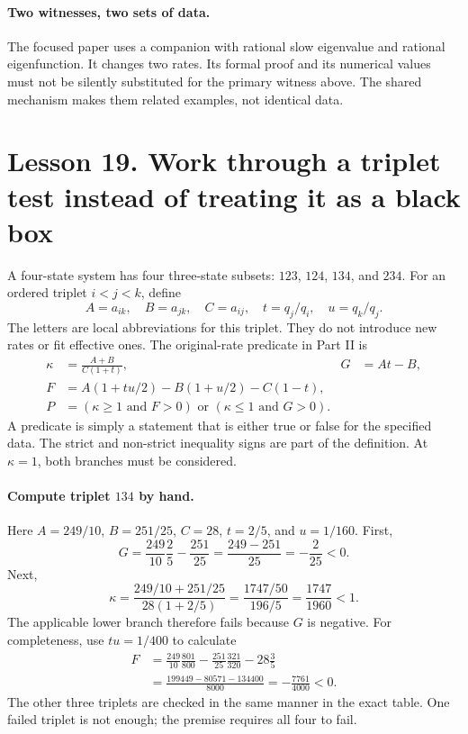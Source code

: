 \paragraph{Two witnesses, two sets of data.}
The focused paper uses a companion with rational slow eigenvalue and
rational eigenfunction. It changes two rates. Its formal proof and its
numerical values must not be silently substituted for the primary witness
above. The shared mechanism makes them related examples, not identical data.

\clearpage
\section*{Lesson 19. Work through a triplet test instead of treating it as a black box}
A four-state system has four three-state subsets: $123$, $124$, $134$, and
$234$. For an ordered triplet $i<j<k$, define
\[
A=a_{ik},\quad B=a_{jk},\quad C=a_{ij},\quad
 t=q_j/q_i,\quad u=q_k/q_j.
\]
The letters are local abbreviations for this triplet. They do not introduce
new rates or fit effective ones. The original-rate predicate in Part II is
\begin{align*}
\kappa&=\frac{A+B}{C(1+t)},&G&=At-B,\\
F&=A(1+tu/2)-B(1+u/2)-C(1-t),\\
P&=(\kappa\geq1\text{ and }F>0)
\text{ or }(\kappa\leq1\text{ and }G>0).
\end{align*}
A predicate is simply a statement that is either true or false for the
specified data. The strict and non-strict inequality signs are part of the
definition. At $\kappa=1$, both branches must be considered.

\paragraph{Compute triplet $134$ by hand.}
Here $A=249/10$, $B=251/25$, $C=28$, $t=2/5$, and $u=1/160$.
First,
\[
G=\frac{249}{10}\frac25-\frac{251}{25}
=\frac{249-251}{25}=-\frac2{25}<0.
\]
Next,
\[
\kappa=\frac{249/10+251/25}{28(1+2/5)}
=\frac{1747/50}{196/5}=\frac{1747}{1960}<1.
\]
The applicable lower branch therefore fails because $G$ is negative.
For completeness, use $tu=1/400$ to calculate
\begin{align*}
F&=\frac{249}{10}\frac{801}{800}
-\frac{251}{25}\frac{321}{320}-28\frac35\\
&=\frac{199449-80571-134400}{8000}
=-\frac{7761}{4000}<0.
\end{align*}
The other three triplets are checked in the same manner in the exact table.
One failed triplet is not enough; the premise requires all four to fail.

